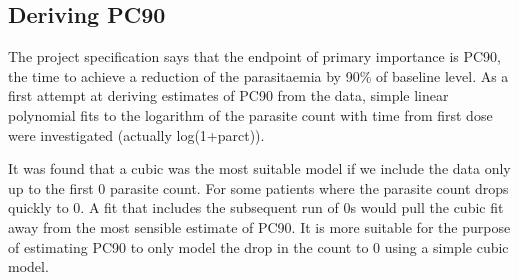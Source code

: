 \subsection{Deriving PC90}
The project specification says that the endpoint of primary importance is PC90, the time to achieve a reduction of the parasitaemia by 90\% of baseline level. As a first attempt at deriving estimates of PC90 from the data, simple linear polynomial fits to the logarithm of the parasite count with time from first dose were investigated (actually log(1+parct)).

It was found that a cubic was the most suitable model if we include the data only up to the first 0 parasite count. For some patients where the parasite count drops quickly to 0. A fit that includes the subsequent run of 0s would pull the cubic fit away from the most sensible estimate of PC90. It is more suitable for the purpose of estimating PC90 to only model the drop in the count to 0 using a simple cubic model. 

